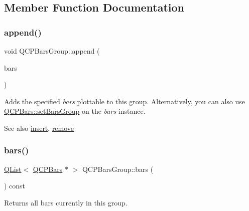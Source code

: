 \subsection{Member Function Documentation}
\mbox{\label{class_q_c_p_bars_group_a809ed63cc4ff7cd5b0b8c96b470163d3}} 
\subsubsection{\texorpdfstring{append()}{append()}}
{\footnotesize\ttfamily void Q\+C\+P\+Bars\+Group\+::append (\begin{DoxyParamCaption}\item[{\hyperlink{class_q_c_p_bars}{Q\+C\+P\+Bars} $\ast$}]{bars }\end{DoxyParamCaption})}

Adds the specified {\itshape bars} plottable to this group. Alternatively, you can also use \hyperlink{class_q_c_p_bars_aedd1709061f0b307c47ddb45e172ef9a}{Q\+C\+P\+Bars\+::set\+Bars\+Group} on the {\itshape bars} instance.

\begin{DoxySeeAlso}{See also}
\hyperlink{class_q_c_p_bars_group_a309a5f7233db189f3ea9c2d04ece6c13}{insert}, \hyperlink{class_q_c_p_bars_group_a215e28a5944f1159013a0e19169220e7}{remove} 
\end{DoxySeeAlso}
\mbox{\label{class_q_c_p_bars_group_a6e4f4e86abbec6a9342f204ef82abef8}} 
\subsubsection{\texorpdfstring{bars()}{bars()}\hspace{0.1cm}{\footnotesize\ttfamily [1/2]}}
{\footnotesize\ttfamily \hyperlink{class_q_list}{Q\+List}$<$ \hyperlink{class_q_c_p_bars}{Q\+C\+P\+Bars} $\ast$ $>$ Q\+C\+P\+Bars\+Group\+::bars (\begin{DoxyParamCaption}{ }\end{DoxyParamCaption}) const\hspace{0.3cm}{\ttfamily [inline]}}

Returns all bars currently in this group.

